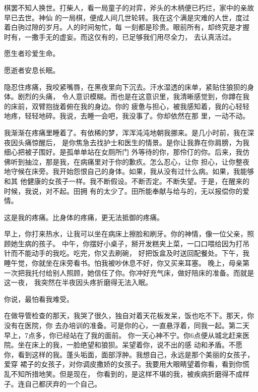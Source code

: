 		棋罢不知人换世。打柴人，看一局童子的对弈，斧头的木柄便已朽烂，家中的亲故早已去世。神仙
	的一局棋，便成人间几世轮转。我在这个满是灾难的人世，度过着白驹过隙的岁月。人的时间匆忙，每
	一刻都是珍贵。眼前所有，却终究是才握时有，一撒手无的虚妄。而这仅有的，已足够我们用尽全力，
	去认真活过。


		愿生者珍爱生命。

		愿逝者安息长眠。

	\endwriting



		隐忍住疼痛，我咬紧嘴唇，在黑夜里向下沉去。汗水湿透的床单，紧贴住狼狈的身体。剧烈的头痛，
	令人意识模糊。而也是在这意识里，我清晰感觉到，你蹲在我的床前，双臂抱拢着俯在我的身边。你的
	疲惫与担心，被我感知着，我的心轻轻地疼，轻轻地碎。我说，去睡一会吧，我没事了。你却依然在那
	里，一动不动。

		我渐渐在疼痛里睡着了。有依稀的梦，浑浑沌沌地朝我挪来。是几小时前，我在深夜因头痛惊醒后，
	是你焦急去找护士和医生的情景。是你让我靠在你肩膀，为我细心把被子围好。是孤单单站在女厕所门
	外等待的你，那伶仃的你。后来，我仿佛听到抽泣，那是我，在病痛里对于你的歉疚。怎么忍心，让你
	担心，让你整夜地守候在床旁。我开始怨恨自己的身体。如果，我从没有过什么病。如果，我能够和其
	他健康的女孩子一样。我不断假设。不断否定。不断失望。于是，在醒来的时候，我说，对不起。田拥
	有的太少了。田所能奉献与给与的，无以报偿你的爱情。

		这是我的疼痛。比身体的疼痛，更无法抵御的疼痛。

		早上，你打来热水，让我可以坐在病床上擦脸和刷牙。你的神情，像一位父亲，照顾她生病的孩子。
	中午，你摆好小桌子，掰开发糕夹上菜，一口口喂给因为打吊针而不能动手的我吃。吃完，你又去刷碗，
	好把饭盒及时送回配餐处。下午，我睡午觉，你就坐在床旁看书。怕我被吵休息不好，你又买来耳塞。
	晚上，母亲第一次把我托付给别人照顾，她信任了你。你冲好充气床，做好陪床的准备。而就是这一夜，
	我突然在半夜因头疼折磨得无法入眠。

		你说，最怕看我难受。

		在做导管检查的那天，我哭了很久，独自对着天花板发呆，饭也吃不下。那天，你没有在医院，你
	去办培训的准备。可是你的心，一直悬浮着，同我一起。第二天早上，7点多，你已经站在了我的面前。
	你一天心神不宁。你6点便从城北赶来医院。坐在床上的我，一脸绝望和狼狈。呆望着你，说不出的感
	动和矛盾。不愿你，看到这样的我。蓬头垢面，面部浮肿。我想自己，永远是那个美丽的女孩子，爱穿
	裙子的女孩子，对你调皮撒娇的女孩子。我要用大眼睛望着你看，看到你慌乱不知所措地笑。但是现在，
	你看到的，是这样不堪的我，被疾病折磨得不成样子。连自己都厌弃的一个自己。

